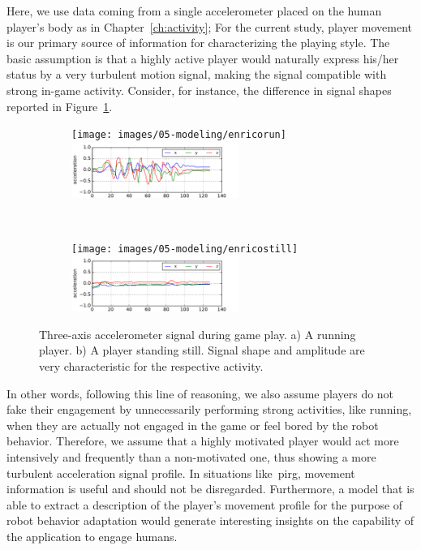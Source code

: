 Here, we use data coming from a single accelerometer placed on the human player's body as in Chapter~\ref{ch:activity}; For the current study, player movement is our primary source of information for characterizing the playing style. The basic assumption is that a highly active player would naturally express his/her status by a very turbulent motion signal, making the signal compatible with strong in-game activity. Consider, for instance, the difference in signal shapes reported in Figure~\ref{figure:acc_signal_shape}.

\begin{figure}[h]
    \centering
    \begin{subfigure}[h]{\textwidth}
        \centering
        \texttt{[image: images/05-modeling/enricorun]} 
        \includegraphics[width=0.6\textwidth]{images/05-modeling/running_sig_profile} 
        \caption{}
    \end{subfigure}\vspace{6pt}
    ~
    \begin{subfigure}[h]{\textwidth}
        \centering
        \texttt{[image: images/05-modeling/enricostill]}
        \includegraphics[width=0.6\textwidth]{images/05-modeling/standing_sig_profile} 
        \caption{}
    \end{subfigure} \vspace{-6pt}
    \caption{Three-axis accelerometer signal during game play. a) A running player. b) A player standing still. Signal shape and amplitude are very characteristic for the respective activity.}
    \label{figure:acc_signal_shape}
\end{figure} \unskip

In other words, following this line of reasoning, we also assume players do not fake their engagement by unnecessarily performing strong activities, like running, when they are actually not engaged in the game or feel bored by the robot behavior. Therefore, we assume that a highly motivated player would act more intensively and frequently than a non-motivated one, thus showing a more turbulent acceleration signal profile. In situations like~\gls{pirg}, movement information is useful and should not be disregarded. Furthermore, a model that is able to extract a description of the player's movement profile for the purpose of robot behavior adaptation would generate interesting insights on the capability of the application to engage humans.

